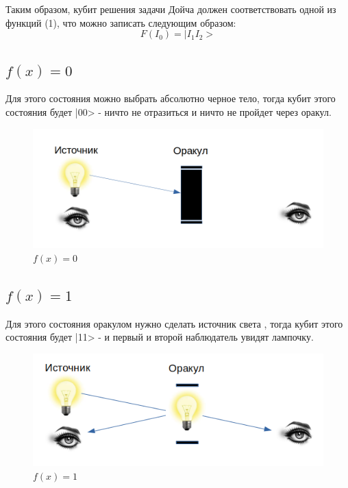 \documentclass[11pt]{article}
\begin{document}
Таким образом, кубит решения задачи Дойча должен соответствовать одной из функций (1), что можно записать следующим образом: \\

\begin{equation}
F(I_0)=|I_1I_2>
\end{equation}


\subsection{$f(x)=0$}
Для этого состояния можно выбрать абсолютно черное тело, тогда кубит этого состояния будет |00> - ничто не отразиться и ничто не пройдет через оракул.

\begin{figure}[htp]
\centering
\includegraphics[scale=0.30]{st1_00.png}
\caption{$f(x)=0$}
\label{}
\end{figure}

\subsection{$f(x)=1$}
Для этого состояния оракулом нужно сделать источник света , тогда кубит этого состояния будет |11> - и первый и второй наблюдатель увидят лампочку. 

\begin{figure}[htp]
\centering
\includegraphics[scale=0.50]{st1_11.png}
\caption{$f(x)=1$}
\label{}
\end{figure}
\end{document}
